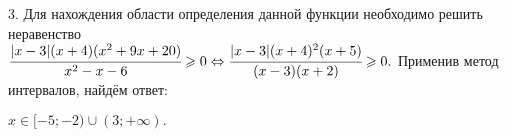 3. Для нахождения области определения данной функции необходимо решить неравенство\\ $\cfrac{|x-3|(x+4)(x^2+9x+20)}{x^2-x-6}\geqslant0\Leftrightarrow
\cfrac{|x-3|(x+4)^2(x+5)}{(x-3)(x+2)}\geqslant0.$ Применив метод интервалов, найдём ответ:
\begin{figure}[ht!]
\end{figure}
$x\in[-5;-2)\cup(3;+\infty).$\\
